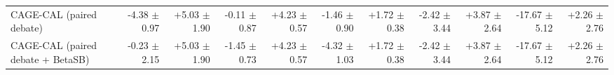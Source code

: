 \begin{tabular}{lrrrrrrrrrr}
CAGE-CAL (paired debate) & -4.38 {\scriptsize $\pm$ 0.97} & +5.03 {\scriptsize $\pm$ 1.90} & -0.11 {\scriptsize $\pm$ 0.87} & +4.23 {\scriptsize $\pm$ 0.57} & -1.46 {\scriptsize $\pm$ 0.90} & +1.72 {\scriptsize $\pm$ 0.38} & -2.42 {\scriptsize $\pm$ 3.44} & +3.87 {\scriptsize $\pm$ 2.64} & -17.67 {\scriptsize $\pm$ 5.12} & +2.26 {\scriptsize $\pm$ 2.76} \\
CAGE-CAL (paired debate + BetaSB) & -0.23 {\scriptsize $\pm$ 2.15} & +5.03 {\scriptsize $\pm$ 1.90} & -1.45 {\scriptsize $\pm$ 0.73} & +4.23 {\scriptsize $\pm$ 0.57} & -4.32 {\scriptsize $\pm$ 1.03} & +1.72 {\scriptsize $\pm$ 0.38} & -2.42 {\scriptsize $\pm$ 3.44} & +3.87 {\scriptsize $\pm$ 2.64} & -17.67 {\scriptsize $\pm$ 5.12} & +2.26 {\scriptsize $\pm$ 2.76} \\
\bottomrule
\end{tabular}
